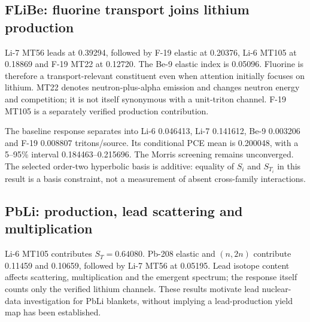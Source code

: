\subsection{FLiBe: fluorine transport joins lithium production}
\begin{table}[tbp]\centering\caption{Leading conditional Sobol indices: FLiBe sphere.}\end{table}
Li-7 MT56 leads at 0.39294, followed by F-19 elastic at 0.20376, Li-6 MT105 at 0.18869 and F-19 MT22 at 0.12720. The Be-9 elastic index is 0.05096. Fluorine is therefore a transport-relevant constituent even when attention initially focuses on lithium. MT22 denotes neutron-plus-alpha emission and changes neutron energy and competition; it is not itself synonymous with a unit-triton channel. F-19 MT105 is a separately verified production contribution.

The baseline response separates into Li-6 0.046413, Li-7 0.141612, Be-9 0.003206 and F-19 0.008807 tritons/source. Its conditional PCE mean is 0.200048, with a 5--95\% interval 0.184463--0.215696. The Morris screening remains unconverged. The selected order-two hyperbolic basis is additive: equality of $S_i$ and $S_{T_i}$ in this result is a basis constraint, not a measurement of absent cross-family interactions.


\subsection{PbLi: production, lead scattering and multiplication}
\begin{table}[tbp]\centering\caption{Leading conditional Sobol indices: PbLi sphere, lithium-production response only.}\end{table}
Li-6 MT105 contributes $S_T=0.64080$. Pb-208 elastic and $(n,2n)$ contribute 0.11459 and 0.10659, followed by Li-7 MT56 at 0.05195. Lead isotope content affects scattering, multiplication and the emergent spectrum; the response itself counts only the verified lithium channels. These results motivate lead nuclear-data investigation for PbLi blankets, without implying a lead-production yield map has been established.

